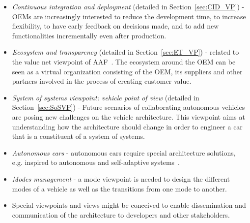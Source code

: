 	\begin{itemize}
	\item \emph{Continuous integration and deployment} (detailed in Section~\ref{sec:CID_VP}) - OEMs are increasingly interested to reduce the development time, to increase flexibility, to have early feedback on decisions made, and to add new functionalities incrementally even after production. %
		\item \emph{Ecosystem and transparency} (detailed in Section~\ref{sec:ET_VP}) - related to the value net viewpoint of AAF~\cite{TUM-I0915,Broy}. %
		The ecosystem around the OEM can be seen as a virtual %
	organization consisting of the OEM, its suppliers and other partners %
	involved in the process of creating customer value.
	\item \emph{System of systems viewpoint: vehicle point of view} (detailed in Section~\ref{sec:SoSVP}) - Future scenarios of collaborating autonomous vehicles are posing new challenges on the vehicle architecture. This viewpoint aims at understanding how the architecture should change in order to engineer a car that is a constituent of a system of systems.
	\item \emph{Autonomous cars} - autonomous cars require special architecture solutions, e.g. inspired to autonomous and self-adaptive systems~\cite{Salehie2009}.
	\item \emph{Modes management} - a mode viewpoint is needed to design the different modes of a vehicle as well as the transitions from one mode to another.
	\item Special viewpoints and views might be conceived to enable dissemination and communication of the architecture to developers and other stakeholders.
	\end{itemize}

